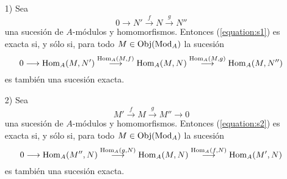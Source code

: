 \documentclass[../main.tex]{subfiles}
\begin{document}
\begin{proposition}\label{pry}
	\begin{itemize}
		\item[1)] Sea\begin{equation}\label{equation:s1}
		0\longrightarrow N'\overset{f}{\longrightarrow}N\overset{g}{\longrightarrow}N''
		\end{equation}
		una sucesión de $A$-módulos y homomorfismos. Entonces (\ref{equation:s1}) es exacta si, y sólo si, para todo $M\in\operatorname{Obj}(\operatorname{Mod}_A)$ la sucesión\begin{equation}\label{equation:s1'}
		0\longrightarrow \operatorname{Hom}_A(M,N')\overset{\operatorname{Hom}_A(M,f)}{\longrightarrow}\operatorname{Hom}_A(M,N)\overset{\operatorname{Hom}_A(M,g)}{\longrightarrow}\operatorname{Hom}_A(M,N'')
		\end{equation}
		es también una sucesión exacta.
		\item[2)] Sea\begin{equation}\label{equation:s2}
		M'\overset{f}{\longrightarrow}M\overset{g}{\longrightarrow}M''\longrightarrow 0
		\end{equation}
		una sucesión de $A$-módulos y homomorfismos. Entonces (\ref{equation:s2}) es exacta si, y sólo si, para todo $M\in\operatorname{Obj}(\operatorname{Mod}_A)$ la sucesión
		\begin{equation}\label{equation:s2'}0\longrightarrow\operatorname{Hom}_A(M'',N)\overset{\operatorname{Hom}_A(g,N)}{\longrightarrow}\operatorname{Hom}_A(M,N)\overset{\operatorname{Hom}_A(f,N)}{\longrightarrow}\operatorname{Hom}_A(M',N)\end{equation}
		es también una sucesión exacta.
	\end{itemize}
\end{proposition}
\end{document}

